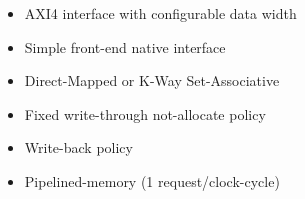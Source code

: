 \begin{itemize}
  \itemsep-0.5em
\item AXI4 interface with configurable data width
\item Simple front-end native interface
\item Direct-Mapped or K-Way Set-Associative
\item Fixed write-through not-allocate policy
\item Write-back policy
\item Pipelined-memory (1 request/clock-cycle)
\end{itemize}
